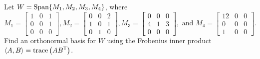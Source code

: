 \label{sec:gram_schmidt_exam}

\ExampleIntro

\begin{example} Let $W = \text{Span}\{M_1, M_2, M_3, M_4\}$, where 
\[M_1 = \left[ \begin{array}{ccc} 1&0&1\\0&0&1\\0&0&0 \end{array} \right], M_2 = \left[ \begin{array}{ccc} 0&0&2\\1&0&1\\0&1&0 \end{array} \right], M_3 = \left[ \begin{array}{ccc} 0&0&0\\4&1&3\\0&0&0 \end{array} \right], \text{ and } M_4 = \left[ \begin{array}{ccc} 12&0&0\\0&0&0\\1&0&0 \end{array} \right].\] Find an orthonormal basis for $W$ using the Frobenius inner product $\langle A,B \rangle  = \text{trace}\left(AB^{\mathsf{T}}\right)$. 


\end{example}
